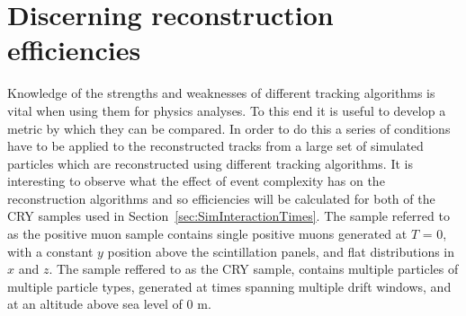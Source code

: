 \section{Discerning reconstruction efficiencies} \label{sec:SimRecoEffic} %
Knowledge of the strengths and weaknesses of different tracking algorithms is vital when using them for physics analyses. To this end it is useful to develop a metric by which they can be compared. In order to do this a series of conditions have to be applied to the reconstructed tracks from a large set of simulated particles which are reconstructed using different tracking algorithms. It is interesting to observe what the effect of event complexity has on the reconstruction algorithms and so efficiencies will be calculated for both of the CRY samples used in Section~\ref{sec:SimInteractionTimes}. The sample referred to as the positive muon sample contains single positive muons generated at $T$ = 0, with a constant $y$ position above the scintillation panels, and flat distributions in $x$ and $z$. The sample reffered to as the CRY sample, contains multiple particles of multiple particle types, generated at times spanning multiple drift windows, and at an altitude above sea level of 0 m. \\

